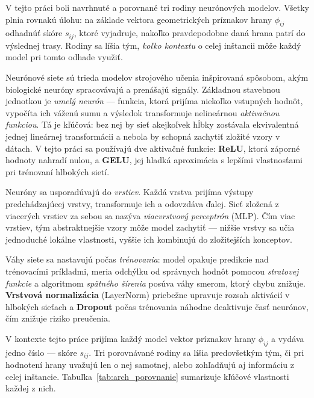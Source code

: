 \indent V tejto práci boli navrhnuté a porovnané tri rodiny neurónových
modelov. Všetky plnia rovnakú úlohu: na základe vektora geometrických
príznakov hrany \(\phi_{ij}\) odhadnúť skóre \(s_{ij}\), ktoré vyjadruje,
nakoľko pravdepodobne daná hrana patrí do výslednej trasy. Rodiny sa líšia
tým, \emph{koľko kontextu} o celej inštancii môže každý model pri tomto
odhade využiť.

\indent Neurónové siete sú trieda modelov strojového učenia inšpirovaná
spôsobom, akým biologické neuróny spracovávajú a prenášajú signály.
Základnou stavebnou jednotkou je \emph{umelý neurón} — funkcia, ktorá
prijíma niekoľko vstupných hodnôt, vypočíta ich váženú sumu a výsledok
transformuje nelineárnou \emph{aktivačnou funkciou}. Tá je kľúčová:
bez nej by sieť akejkoľvek hĺbky zostávala ekvivalentná jednej lineárnej
transformácii a nebola by schopná zachytiť zložité vzory v dátach.
V tejto práci sa používajú dve aktivačné funkcie: \textbf{ReLU},
ktorá záporné hodnoty nahradí nulou, a \textbf{GELU}, jej hladká
aproximácia s lepšími vlastnosťami pri trénovaní hlbokých sietí.

\indent Neuróny sa usporadúvajú do \emph{vrstiev}. Každá vrstva prijíma
výstupy predchádzajúcej vrstvy, transformuje ich a odovzdáva ďalej. Sieť
zložená z viacerých vrstiev za sebou sa nazýva \emph{viacvrstvový
perceptrón} (MLP). Čím viac vrstiev, tým abstraktnejšie vzory môže model
zachytiť — nižšie vrstvy sa učia jednoduché lokálne vlastnosti, vyššie
ich kombinujú do zložitejších konceptov.

\indent Váhy siete sa nastavujú počas \emph{trénovania}: model opakuje
predikcie nad trénovacími príkladmi, meria odchýlku od správnych hodnôt
pomocou \emph{stratovej funkcie} a algoritmom \emph{spätného šírenia}
posúva váhy smerom, ktorý chybu znižuje.
\textbf{Vrstvová normalizácia} (LayerNorm) priebežne upravuje rozsah
aktivácií v hlbokých sieťach a \textbf{Dropout} počas trénovania
náhodne deaktivuje časť neurónov, čím znižuje riziko preučenia.

\indent V kontexte tejto práce prijíma každý model vektor príznakov
hrany \(\phi_{ij}\) a vydáva jedno číslo — skóre \(s_{ij}\). Tri
porovnávané rodiny sa líšia predovšetkým tým, či pri hodnotení hrany
uvažujú len o nej samotnej, alebo zohľadňujú aj informáciu z celej
inštancie. Tabuľka~\ref{tab:arch_porovnanie} sumarizuje kľúčové
vlastnosti každej z nich.

